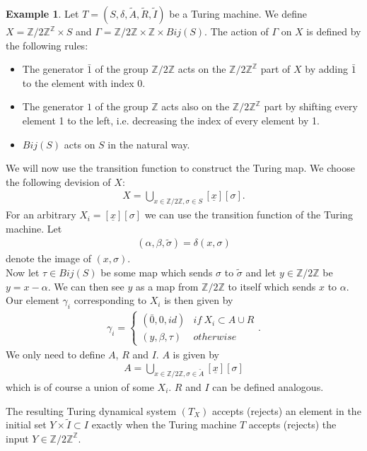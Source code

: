 \documentclass[12pt,a4paper]{scrartcl}
\theoremstyle{plain}
\theoremstyle{definition}
\newtheorem{Example}[Theorem]{Example}
\numberwithin{equation}{section}
\newcommand{\Z}{\mathbb{Z}} %
\newcommand{\2}{\mathbb{Z} / 2 \mathbb{Z}}
\newcommand{\1}{\bar{1}}
\newcommand{\0}{\bar{0}}
\begin{document}
\begin{Example}\label{TMtoTDS}
	Let  $T=(S,\delta, \tilde{A}, \tilde{R}, \tilde{I})$ be a Turing machine. We define $X = \2^\Z \times S$ and $\Gamma =   \2 \times \Z \times Bij(S)$.
	The action of $\Gamma$ on $X$ is defined by the following rules:
	\begin{itemize}
		\item The generator $\1$ of the group $\Z / 2\Z$ acts on the $\Z / 2\Z^\Z$ part of $X$ by adding $\1$ to the element with index $0$.
		\item The generator $1$ of the group $\Z$ acts also on the $\Z / 2\Z^\Z$ part by shifting every element 1 to the left, i.e. decreasing the index of every element by 1.
		\item $Bij(S)$ acts on $S$ in the natural way.
	\end{itemize}
	We will now use the transition function to construct the Turing map. We choose the following devision of $X$:
	\begin{align*}
	X = \bigcup_{x \in \2, \sigma \in S} [\underline{x}][\sigma].
	\end{align*}
	For an arbitrary $X_i = [\underline{x}][\sigma]$ we can use the transition function of the Turing machine. Let
	\begin{align*}
		(\alpha, \beta,\tilde{\sigma}) = \delta(x, \sigma)
	\end{align*} 
	denote  the image of $(x, \sigma)$. \\
	Now let $\tau \in Bij(S)$ be some map which sends $\sigma$ to $\tilde{\sigma}$ and let $y \in \2$ be $y=x-\alpha$. We can then see $y$ as a map from $\2$ to itself which sends $x$ to $\alpha$. Our element $\gamma_i$ corresponding to $X_i$ is then given by 
	\begin{align*}
		\gamma_i = \begin{cases}
			(\0, 0, id) & if \ X_i \subset A \cup R \\
			(y, \beta, \tau) & otherwise
		\end{cases}.
	\end{align*} 
	We only need to define $A$, $R$ and $I$. $A$ is given by
	\begin{align*}
	A = \bigcup_{x \in \2, \sigma \in \tilde{A}}[\underline{x}][\sigma]
	\end{align*}
	which is of course a union of some $X_i$. $R$ and $I$ can be defined analogous. 
	
	The resulting Turing dynamical system $(T_X)$ accepts (rejects) an element in the initial set $Y \times \tilde{I} \subset I$ exactly when the Turing machine $T$ accepts (rejects) the input $Y \in \2^\Z$.
\end{Example} 
\end{document}
